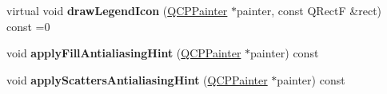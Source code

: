 \begin{DoxyCompactItemize}
virtual void {\bfseries draw\+Legend\+Icon} (\mbox{\hyperlink{class_q_c_p_painter}{Q\+C\+P\+Painter}} $\ast$painter, const Q\+RectF \&rect) const =0
\item 
\mbox{\label{class_q_c_p_abstract_plottable_a8d06a59ea23324cce6330ebf2262c0ed}} 
void {\bfseries apply\+Fill\+Antialiasing\+Hint} (\mbox{\hyperlink{class_q_c_p_painter}{Q\+C\+P\+Painter}} $\ast$painter) const
\item 
\mbox{\label{class_q_c_p_abstract_plottable_ac95f26b15a1e5d9c7bd2c0a46d760fc9}} 
void {\bfseries apply\+Scatters\+Antialiasing\+Hint} (\mbox{\hyperlink{class_q_c_p_painter}{Q\+C\+P\+Painter}} $\ast$painter) const
\end{DoxyCompactItemize}
